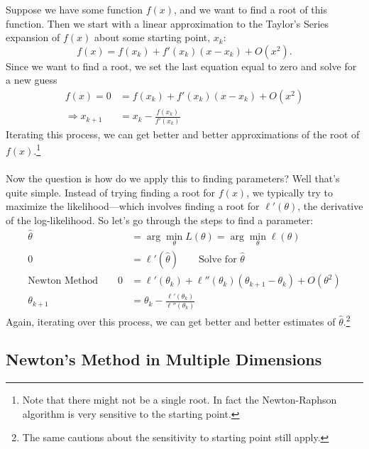 \documentclass[12pt]{article}
\begin{document}
Suppose we have some function $f(x)$, and we want to find a root
of this function. Then we start with a linear approximation
to the Taylor's Series expansion 
of $f(x)$ about some starting point, $x_k$:
   \[ f(x) = f(x_k) + f'(x_k)(x-x_k) + O(x^2).\]
Since we want to find a root, we set the last equation equal to
zero and solve for a new guess
\begin{align*}
   f(x) = 0 &= f(x_k) + f'(x_k)(x-x_k) + O(x^2) \\
   \Rightarrow x_{k+1} &= x_k - \frac{f(x_k)}{f'(x_k)} 
\end{align*}
Iterating this process, we can get better and better approximations
of the root of $f(x)$.\footnote{Note that there might not be a
single root. In fact the Newton-Raphson algorithm is very sensitive
to the starting point.}
\\
\\
Now the question is how do we apply this to finding parameters? Well
that's quite simple. Instead of trying finding a root for $f(x)$,
we typically try to maximize the likelihood---which involves finding
a root for $\ell'(\theta)$, the derivative of the log-likelihood.
So let's go through the steps to find a parameter:
\begin{align*}
   \hat{\theta} &= \arg \min_\theta L(\theta) = 
      \arg \min_\theta \ell(\theta) \\
      0 &= \ell'(\hat{\theta}) \qquad \text{Solve for $\hat{\theta}$}\\
      \text{Newton Method} \qquad 0 &= \ell'({\theta}_k) +
      \ell''({\theta}_k)({\theta}_{k+1} - {\theta}_k) 
	 + O({\theta}^2)\\
	 {\theta}_{k+1} &= {\theta}_k - 
	 \frac{\ell'({\theta}_k)}{\ell''({\theta}_k)}
\end{align*}
Again, iterating over this process, we can get better and better
estimates of $\hat{\theta}$.\footnote{The same cautions about 
the sensitivity to starting point still apply.}



\subsection{Newton's Method in Multiple Dimensions}
\end{document}
